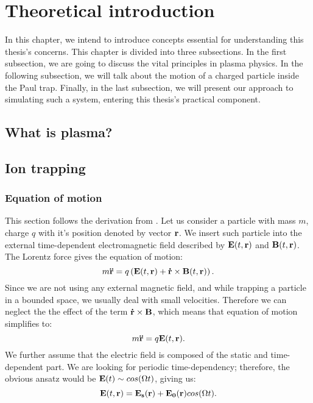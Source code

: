 \chapter{Theoretical introduction}
\label{chap:refs}

In this chapter, we intend to introduce concepts essential for understanding this thesis's concerns. This chapter is divided into three subsections. In the first subsection, we are going to discuss the vital principles in plasma physics. In the following subsection, we will talk about the motion of a charged particle inside the Paul trap. Finally, in the last subsection, we will present our approach to simulating such a system, entering this thesis's practical component.

\section{What is plasma?}

\section{Ion trapping}
	\subsection{Equation of motion}
This section follows the derivation from \cite{gerlich1992inhomogeneous}.
Let us consider a particle with mass $m$, charge $q$ with it's position denoted by vector $\vb{r}$. We insert such particle into the external time-dependent electromagnetic field described by $\vb{E}(t,\vb{r})$ and $\vb{B}(t,\vb{r})$. The Lorentz force gives the equation of motion:
\begin{equation}
	m \vb{\ddot{r}} = q \left(\vb{E}(t,\vb{r}) + \vb{\dot{r}} \times \vb{B}(t,\vb{r})\right).
\end{equation}
Since we are not using any external magnetic field, and while trapping a particle in a bounded space, we usually deal with small velocities. Therefore we can neglect the the effect of the term $\vb{\dot{r}} \times \vb{B}$, which means that equation of motion simplifies to:
\begin{equation}
	\label{equation of motion}
	m \vb{\ddot{r}} = q \vb{E}(t,\vb{r}).
\end{equation}
We further assume that the electric field is composed of the static and time-dependent part. We are looking for periodic time-dependency; therefore, the obvious ansatz would be $\vb{E}(t) \sim cos(\Omega t)$, giving us:
\begin{equation}
	\vb{E}(t,\vb{r}) = \vb{E_s}(\vb{r}) + \vb{E_0}(\vb{r}) cos(\Omega t).
\end{equation}
